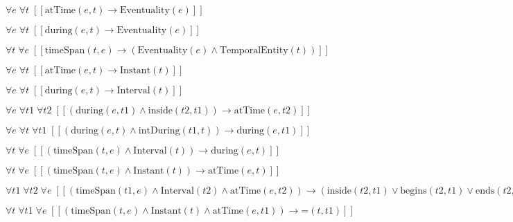 \documentclass{article}
\begin{document}
$\forall e\; \forall t\;  \left[ \left[ \textrm{atTime}(e,t) \rightarrow \textrm{Eventuality}(e) \right] \right]$

$\forall e\; \forall t\;  \left[ \left[ \textrm{during}(e,t) \rightarrow \textrm{Eventuality}(e) \right] \right]$

$\forall t\; \forall e\;  \left[ \left[ \textrm{timeSpan}(t,e) \rightarrow \left(\textrm{Eventuality}(e) \land \textrm{TemporalEntity}(t)\right) \right] \right]$

$\forall e\; \forall t\;  \left[ \left[ \textrm{atTime}(e,t) \rightarrow \textrm{Instant}(t) \right] \right]$

$\forall e\; \forall t\;  \left[ \left[ \textrm{during}(e,t) \rightarrow \textrm{Interval}(t) \right] \right]$

$\forall e\; \forall t1\; \forall t2\;  \left[ \left[ \left(\textrm{during}(e,t1) \land \textrm{inside}(t2,t1)\right) \rightarrow \textrm{atTime}(e,t2) \right] \right]$

$\forall e\; \forall t\; \forall t1\;  \left[ \left[ \left(\textrm{during}(e,t) \land \textrm{intDuring}(t1,t)\right) \rightarrow \textrm{during}(e,t1) \right] \right]$

$\forall t\; \forall e\;  \left[ \left[ \left(\textrm{timeSpan}(t,e) \land \textrm{Interval}(t)\right) \rightarrow \textrm{during}(e,t) \right] \right]$

$\forall t\; \forall e\;  \left[ \left[ \left(\textrm{timeSpan}(t,e) \land \textrm{Instant}(t)\right) \rightarrow \textrm{atTime}(e,t) \right] \right]$

$\forall t1\; \forall t2\; \forall e\;  \left[ \left[ \left(\textrm{timeSpan}(t1,e) \land \textrm{Interval}(t2) \land \textrm{atTime}(e,t2)\right) \rightarrow \left(\textrm{inside}(t2,t1) \lor \textrm{begins}(t2,t1) \lor \textrm{ends}(t2,t1)\right) \right] \right]$

$\forall t\; \forall t1\; \forall e\;  \left[ \left[ \left(\textrm{timeSpan}(t,e) \land \textrm{Instant}(t) \land \textrm{atTime}(e,t1)\right) \rightarrow \textrm{=}(t,t1) \right] \right]$
\end{document}
